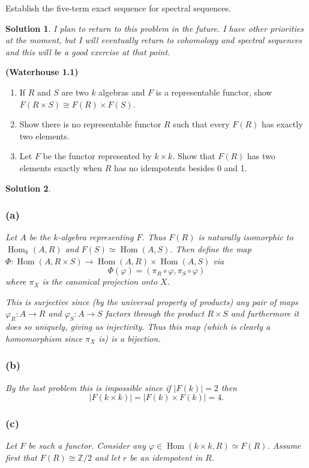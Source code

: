 \documentclass[12pt]{article}
\theoremstyle{nonumberbreak}
\newtheorem{sol}{Solution}
\theoremstyle{changebreak}
\theoremstyle{nonumberplain}
\theoremstyle{change}
\newenvironment{wprob}[1]{\begin{prob}{\normalfont\bfseries (Waterhouse #1) }\itshape}{\end{prob}}
\newcommand*{\bbZ}{\mathbb{Z}}
\DeclareMathOperator{\Hom}{Hom}
\begin{document}
\begin{prob}
	Establish the five-term exact sequence for spectral sequences.
\end{prob}
\begin{sol}
	I plan to return to this problem in the future. I have other priorities at the moment,
	but I will eventually return to cohomology and spectral sequences and this will be a good
	exercise at that point.
\end{sol}

\begin{wprob}{1.1}
	\begin{enumerate}
		\item If $R$ and $S$ are two $k$ algebras and $F$ is a representable functor, show $F(R\times S)\cong F(R)\times F(S)$.
		\item Show there is no representable functor $R$ such that every $F(R)$ has exactly two elements.
		\item Let $F$ be the functor represented by $k\times k$. Show that $F(R)$ has two elements exactly when $R$ has no idempotents besides 0 and 1.
	\end{enumerate}
\end{wprob}

\begin{sol}
	\subsubsection*{(a)}
	Let $A$ be the $k$-algebra representing $F$. Thus $F(R)$ is naturally isomorphic to
	$\Hom_k(A,R)$ and $F(S)\simeq\Hom(A,S)$. Then define the map $\Phi:\Hom(A,R\times S)\to\Hom(A,R)\times\Hom(A,S)$
	via
	\[\Phi(\varphi)=(\pi_R\circ\varphi,\pi_S\circ\varphi)\]
	where $\pi_X$ is the canonical projection onto $X$.

	This is surjective since (by the universal property of products) any pair of maps
	$\varphi_R:A\to R$ and $\varphi_S:A\to S$ factors through the product $R\times S$
	and furthermore it does so \textit{uniquely}, giving us injectivity. Thus this map
	(which is clearly a homomorphism since $\pi_X$ is) is a bijection.
	\subsubsection*{(b)}
	By the last problem this is impossible since if $|F(k)|=2$ then 
	\[|F(k\times k)|=|F(k)\times F(k)|=4.\]
	\subsubsection*{(c)}
	Let $F$ be such a functor. Consider any $\varphi\in\Hom(k\times k, R)\simeq F(R)$.
	Assume first that $F(R)\cong \bbZ/2$ and let $r$ be an idempotent in $R$. 
\end{sol}
\end{document}
